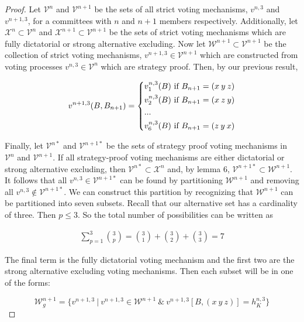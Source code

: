 \documentclass{amsart}
\theoremstyle{plain}
\begin{document}
\begin{proof}
    Let $\mathcal{V}^{n}$ and $\mathcal{V}^{n+1}$ be the sets of all strict voting mechanisms, $v^{n,3}$ and $v^{n+1,3}$, for a committees with $n$ and $n+1$ members respectively. Additionally, let $\mathcal{X}^{n} \subset \mathcal{V}^{n}$ and $\mathcal{X}^{n+1} \subset \mathcal{V}^{n+1}$ be the sets of strict voting mechanisms which are fully dictatorial or strong alternative excluding. Now let $\mathcal{W}^{n+1} \subset \mathcal{V}^{n+1}$ be the collection of strict voting mechanisms, $v^{n+1, 3} \in \mathcal{V}^{n+1}$ which are constructed from voting processes $v^{n, 3} \in \mathcal{V}^{n}$ which are strategy proof. Then, by our previous result, 

\[ v^{n+1,3}(B, B_{n+1}) = 
    \begin{dcases}
       v_1^{n,3}(B) \text{ if } B_{n+1} = (x \: y \: z)  \\  
       v_2^{n,3}(B) \text{ if } B_{n+1} = (x \: z \: y)  \\
       ... \\
       v_6^{n,3}(B) \text{ if } B_{n+1} = (z \: y \: x) 
    \end{dcases}
\]

\vskip 0.25cm
Finally, let $\mathcal{V}^{n*}$ and $\mathcal{V}^{n+1*}$ be the sets of strategy proof voting mechanisms in $\mathcal{V}^{n}$ and $\mathcal{V}^{n+1}$. If all strategy-proof voting mechanisms are either dictatorial or strong alternative excluding, then $\mathcal{V}^{n*} \subset \mathcal{X}^{n}$ and, by lemma 6, $\mathcal{V}^{n+1*} \subset \mathcal{W}^{n+1}$. It follows that all $v^{n, 3} \in \mathcal{V}^{n+1*}$ can be found by partitioning $\mathcal{W}^{n+1}$ and removing all $v^{n, 3} \notin \mathcal{V}^{n+1*}$. We can construct this partition by recognizing that $\mathcal{W}^{n+1}$ can be partitioned into seven subsets. Recall that our alternative set has a cardinality of three. Then $p \le 3$. So the total number of possibilities can be written as 

\begin{align*}
    \sum_{p = 1}^{3} {{3}\choose{p}} = {{3}\choose{1}} + {{3}\choose{2}} + {{3}\choose{3}} = 7
\end{align*}

\vskip 0.5cm

The final term is the fully dictatorial voting mechanism and the first two are the strong alternative excluding voting mechanisms. Then each subset will be in one of the forms:

\begin{equation*}
    \mathcal{W}_g^{n+1} = \{v^{n+1,3} \: | \: v^{n+1,3} \in \mathcal{W}^{n+1} \: \& \: v^{n+1,3}[B, (x \: y \: z)] = h_K^{n,3}\}
\end{equation*}


\end{proof}
\end{document}
